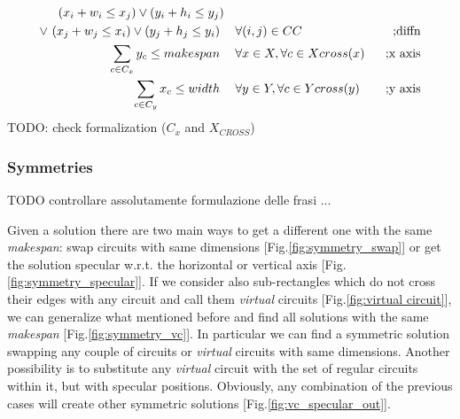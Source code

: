     \begin{align}
        (x_i + w_i \leq x_j) \lor (y_i + h_i \leq y_j) &\ \ &\ \nonumber \\
        \lor\ (x_j + w_j \leq x_i) \lor (y_j + h_j \leq y_i)\ &\                \hspace{0.2cm} \forall (i,j) \in CC &\ \text{;diffn} 
        \label{eq:diffn}            \\
        \sum_{c \in C_x} y_c \leq makespan\ &\ \hspace{0.2cm} \forall x \in X, \forall c \in Xcross(x)\ &\ \text{;x axis} 
        \label{eq:cumulative_x}     \\
        \sum_{c \in C_y} x_c \leq width\ &\ \hspace{0.2cm} \forall y \in Y, \forall c \in Ycross(y)\ &\ \text{;y axis}
        \label{eq:cumulative_y}     
    \end{align}
    \colorbox{BurntOrange}{TODO: check formalization ($C_x$ and $X_{CROSS}$)}

    \subsubsection{Symmetries} \label{sec:symmetries}
    \colorbox{BurntOrange}{TODO controllare assolutamente formulazione delle frasi ...}


        Given a solution there are two main ways to get a different one with the same \textit{makespan}:
        swap circuits with same dimensions [Fig.\ref{fig:symmetry_swap}] or get the solution specular w.r.t. the horizontal 
        or vertical axis [Fig.\ref{fig:symmetry_specular}].
        If we consider also sub-rectangles which do not cross their edges with any circuit and call them 
        \textit{virtual} circuits [Fig.\ref{fig:virtual circuit}], we can generalize what mentioned before and find all solutions with 
        the same \textit{makespan} [Fig.\ref{fig:symmetry_vc}].
        In particular we can find a symmetric solution swapping any couple of circuits or \textit{virtual} circuits 
        with same dimensions. Another possibility is to substitute any \textit{virtual} circuit with the set of regular circuits within it, 
        but with specular positions. Obviously, any combination of the previous cases will create other symmetric 
        solutions [Fig.\ref{fig:vc_specular_out}].

